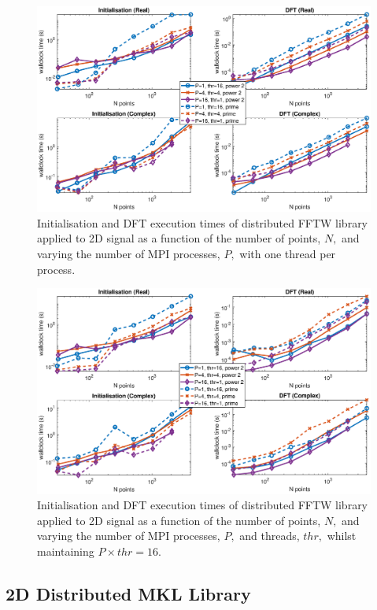 \documentclass[a4paper]{article}
\begin{document}
\begin{figure}[htb]
    \centering
    \includegraphics[width=0.9\linewidth]{../results/fftw_2d_mpi.eps}
  \caption{Initialisation and DFT execution times of distributed FFTW library applied to 2D signal as a function of the
    number of points, $N,$ and varying the number of MPI processes, $P,$ with one thread per process.}
  \label{2DDistFFTW}
\end{figure}

\begin{figure}[htb]
    \centering
    \includegraphics[width=0.9\linewidth]{../results/fftw_2d_mpi_thr.eps}
  \caption{Initialisation and DFT execution times of distributed FFTW library applied to 2D signal as a function of the
    number of points, $N,$ and varying the number of MPI processes, $P,$ and threads, $thr,$ whilst maintaining $P\times thr=16.$}
  \label{2DDistFFTW16}
\end{figure}



\subsection{2D Distributed MKL Library}\label{Sec:2DDistMKL}
\end{document}
